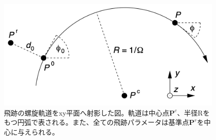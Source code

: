 \begin{figure}[H]
	\begin{center}
 \includegraphics[keepaspectratio, scale=0.4]
 	{Figure/Appendix/xy.png}
 		\caption{飛跡の螺旋軌道をxy平面へ射影した図。軌道は中心点$\mathbf{P}^c$、半径Rをもつ円弧で表される。また、全ての飛跡パラメータは基準点$\mathbf{P}^r$を中心に与えられる。}
 		\label{xy}
	\end{center}
\end{figure}

